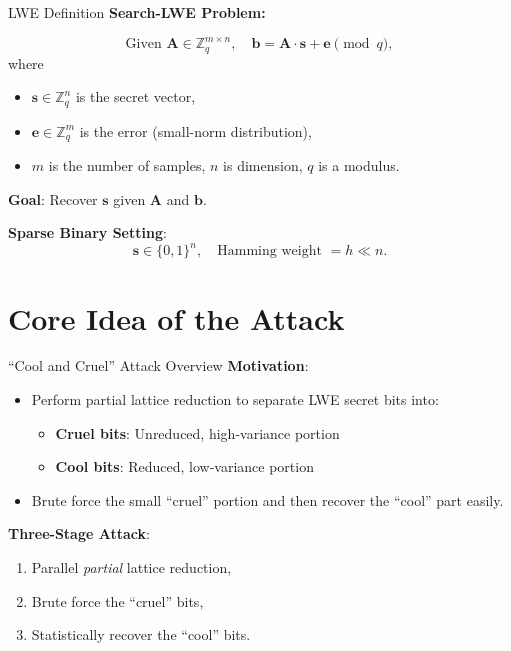 \documentclass{beamer}
\begin{document}
\begin{frame}{LWE Definition}
  \textbf{Search-LWE Problem:}

  \[
    \text{Given } \mathbf{A} \in \mathbb{Z}_q^{m \times n}, \quad
    \mathbf{b} = \mathbf{A} \cdot \mathbf{s} + \mathbf{e} \pmod{q},
  \]
  where
  \begin{itemize}
    \item $\mathbf{s} \in \mathbb{Z}_q^n$ is the secret vector,
    \item $\mathbf{e} \in \mathbb{Z}_q^m$ is the error (small-norm distribution),
    \item $m$ is the number of samples, $n$ is dimension, $q$ is a modulus.
  \end{itemize}

  \textbf{Goal}: Recover $\mathbf{s}$ given $\mathbf{A}$ and $\mathbf{b}$.

  \vspace{0.3cm}
  \textbf{Sparse Binary Setting}:
  \[
    \mathbf{s} \in \{0,1\}^n, \quad \text{Hamming weight } = h \ll n.
  \]
\end{frame}

\section{Core Idea of the Attack}
\begin{frame}{``Cool and Cruel'' Attack Overview}
  \textbf{Motivation}:
  \begin{itemize}
    \item Perform partial lattice reduction to separate LWE secret bits into:
    \begin{itemize}
      \item \textbf{Cruel bits}: Unreduced, high-variance portion
      \item \textbf{Cool bits}: Reduced, low-variance portion
    \end{itemize}
    \item Brute force the small ``cruel'' portion and then recover the ``cool'' part easily.
  \end{itemize}

  \vspace{0.4cm}
  \textbf{Three-Stage Attack}:
  \begin{enumerate}
    \item Parallel \emph{partial} lattice reduction,
    \item Brute force the ``cruel'' bits,
    \item Statistically recover the ``cool'' bits.
  \end{enumerate}
\end{frame}
\end{document}
